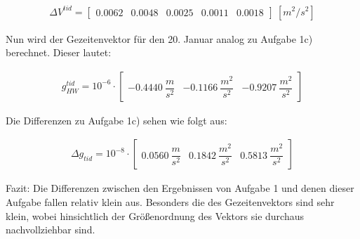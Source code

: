 \begin{gather*}
\Delta V^{tid} = \begin{bmatrix}
0.0062 & 0.0048 & 0.0025 & 0.0011 & 0.0018
\end{bmatrix}~[m^2/s^2]
\end{gather*} 

Nun wird der Gezeitenvektor für den 20. Januar analog zu Aufgabe 1c) berechnet. Dieser lautet: 

\begin{gather*}
g_{HW}^{tid} = 10^{-6} \cdot \begin{bmatrix}
-0.4440 ~\dfrac{m}{s^2} & -0.1166 ~\dfrac{m^2}{s^2} &  -0.9207 ~\dfrac{m^2}{s^2}
\end{bmatrix} 
\end{gather*}

Die Differenzen zu Aufgabe 1c) sehen wie folgt aus: 

\begin{gather*}
\Delta g_{tid} = 10^{-8} \cdot \begin{bmatrix}
0.0560 ~\dfrac{m}{s^2} &  0.1842 ~\dfrac{m^2}{s^2} &  0.5813 ~\dfrac{m^2}{s^2}
\end{bmatrix}
\end{gather*}

Fazit: Die Differenzen zwischen den Ergebnissen von Aufgabe 1 und denen dieser Aufgabe fallen relativ klein aus. Besonders die des Gezeitenvektors sind sehr klein, wobei hinsichtlich der Größenordnung des Vektors sie durchaus nachvollziehbar sind. 

